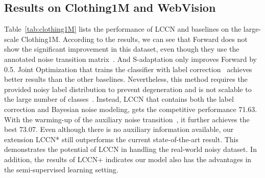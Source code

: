 \documentclass[journal]{IEEEtran}
\begin{document}
\subsection{Results on Clothing1M and WebVision}
Table~\ref{tab:clothing1M} lists the performance of LCCN and baselines on the large-scale Clothing1M. According to the results, we can see that Forward does not show the significant improvement in this dataset, even though they use the annotated noise transition matrix~\cite{xiao2015learning}. And S-adaptation only improves Forward by 0.5. Joint Optimization that trains the classifier with label correction~\cite{tanaka2018joint} achieves better results than the other baselines. Nevertheless, this method requires the provided noisy label distribution to prevent degeneration and is not scalable to the large number of classes~\cite{tanaka2018joint}. Instead, LCCN that contains both the label correction and Bayesian noise modeling, gets the competitive performance 71.63. With the warming-up of the auxiliary noise transition~\cite{xiao2015learning}, it further achieves the best 73.07. Even although there is no auxiliary information available, our extension LCCN* still outperforms the current state-of-the-art result. This demonstrates the potential of LCCN in handling the real-world noisy dataset. In addition, the results of LCCN+ indicates our model also has the advantages in the semi-supervised learning setting. 
\end{document}
